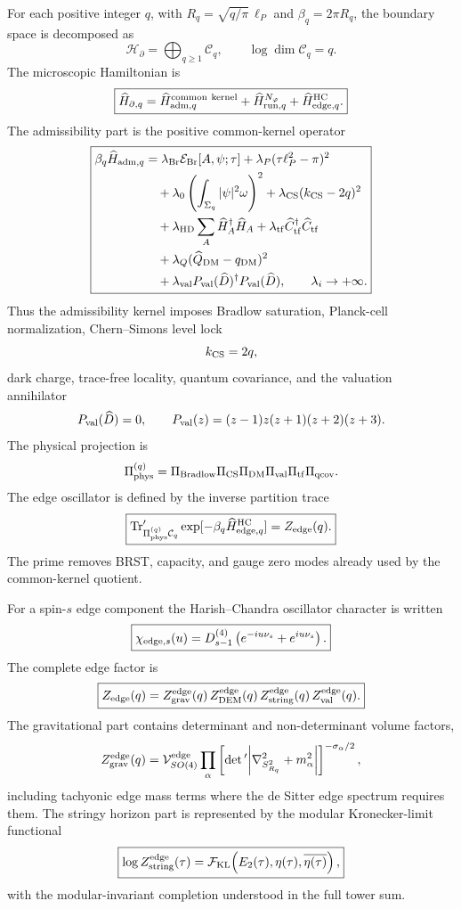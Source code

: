 \documentclass[aps,prd,reprint,nofootinbib,superscriptaddress,floatfix]{revtex4-2}
\numberwithin{equation}{section}
\theoremstyle{definition}
\theoremstyle{plain}
\begin{document}
For each positive integer \(q\), with \(R_q=\sqrt{q/\pi}\,\ell_P\) and
\(\beta_q=2\pi R_q\), the boundary space is decomposed as
\[
\boxed{
\mathcal H_\partial
=
\bigoplus_{q\ge1}\mathcal C_q,
\qquad
\log\dim\mathcal C_q=q.
}
\]
The microscopic Hamiltonian is
\[
\boxed{
\widehat H_{\partial,q}
=
\widehat H_{{\rm adm},q}^{\rm common\ kernel}
+
\widehat H_{{\rm run},q}^{N_\varphi}
+
\widehat H_{{\rm edge},q}^{\rm HC}.
}
\]
The admissibility part is the positive common-kernel operator
\[
\boxed{
\begin{aligned}
\beta_q\widehat H_{{\rm adm},q}
&=
\lambda_{\rm Br}\mathcal E_{\rm Br}[A,\psi;\tau]
+\lambda_P(\tau\ell_P^2-\pi)^2
\\
&\quad
+\lambda_0\left(\int_{\Sigma_q}|\psi|^2\omega\right)^2
+\lambda_{\rm CS}(k_{\rm CS}-2q)^2
\\
&\quad
+\lambda_{\rm HD}\sum_A\widehat H_A^\dagger\widehat H_A
+\lambda_{\rm tf}\widehat C_{\rm tf}^\dagger\widehat C_{\rm tf}
\\
&\quad
+\lambda_Q(\widehat Q_{\rm DM}-q_{\rm DM})^2
\\
&\quad
+\lambda_{\rm val}
P_{\rm val}(\widehat D)^\dagger P_{\rm val}(\widehat D),
\qquad
\lambda_i\rightarrow+\infty .
\end{aligned}
}
\]
Thus the admissibility kernel imposes Bradlow saturation, Planck-cell
normalization, Chern--Simons level lock
\[
k_{\rm CS}=2q,
\]
dark charge, trace-free locality, quantum covariance, and the valuation
annihilator
\[
P_{\rm val}(\widehat D)=0,
\qquad
P_{\rm val}(z)=(z-1)z(z+1)(z+2)(z+3).
\]
The physical projection is
\[
\Pi_{\rm phys}^{(q)}
=
\Pi_{\rm Bradlow}\Pi_{\rm CS}\Pi_{\rm DM}\Pi_{\rm val}
\Pi_{\rm tf}\Pi_{\rm qcov}.
\]
The edge oscillator is defined by the inverse partition trace
\[
\boxed{
\operatorname{Tr}'_{\Pi_{\rm phys}^{(q)}\mathcal C_q}
\exp[-\beta_q\widehat H_{{\rm edge},q}^{\rm HC}]
=
Z_{\rm edge}(q).
}
\]
The prime removes BRST, capacity, and gauge zero modes already used by the
common-kernel quotient.

For a spin-\(s\) edge component the Harish--Chandra oscillator character is
written
\[
\boxed{
\chi_{{\rm edge},s}(u)
=
D^{(4)}_{s-1}
\left(e^{-iu\nu_s}+e^{iu\nu_s}\right).
}
\]
The complete edge factor is
\[
\boxed{
Z_{\rm edge}(q)
=
Z_{\rm grav}^{\rm edge}(q)\,
Z_{\rm DEM}^{\rm edge}(q)\,
Z_{\rm string}^{\rm edge}(q)\,
Z_{\rm val}^{\rm edge}(q).
}
\]
The gravitational part contains determinant and non-determinant volume factors,
\[
Z_{\rm grav}^{\rm edge}(q)
=
\mathcal V_{SO(4)}^{\rm edge}
\prod_\alpha
\left[
\det{}'\!\left|\nabla_{S^2_{R_q}}^2+m_\alpha^2\right|
\right]^{-\sigma_\alpha/2},
\]
including tachyonic edge mass terms where the de Sitter edge spectrum requires
them.  The stringy horizon part is represented by the modular Kronecker-limit
functional
\[
\boxed{
\log Z_{\rm string}^{\rm edge}(\tau)
=
\mathcal F_{\rm KL}
\!\left(E_2(\tau),\eta(\tau),\overline{\eta(\tau)}\right),
}
\]
with the modular-invariant completion understood in the full tower sum.
\end{document}
